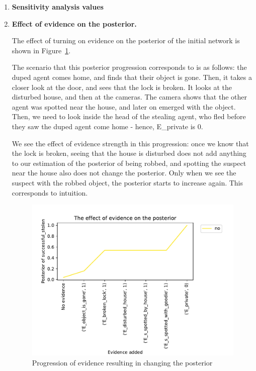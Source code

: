 \begin{enumerate}
\item \textbf{Sensitivity analysis values}

\item \textbf{Effect of evidence on the posterior.}

The effect of turning on evidence on the posterior of the initial network is shown in Figure~\ref{baseposterior}.

The scenario that this posterior progression corresponds to is as follows: the duped agent comes home, and finds that their object is gone. Then, it takes a closer look at the door, and sees that the lock is broken. It looks at the disturbed house, and then at the cameras. The camera shows that the other agent was spotted near the house, and later on emerged with the object. Then, we need to look inside the head of the stealing agent, who fled before they saw the duped agent come home - hence, E\_private is 0.

We see the effect of evidence strength in this progression: once we know that the lock is broken, seeing that the house is disturbed does not add anything to our estimation of the posterior of being robbed, and spotting the suspect near the house also does not change the posterior. Only when we see the suspect with the robbed object, the posterior starts to increase again. This corresponds to intuition.

\begin{figure}[htbp]
 \centering
\includegraphics[width=0.6\linewidth]{../experiments/StolenLaptop/plots/posterior_base_networkStolenLaptop.pdf}
\caption{ Progression of evidence resulting in changing the posterior}
\label{baseposterior}
\end{figure}%


\end{enumerate}


